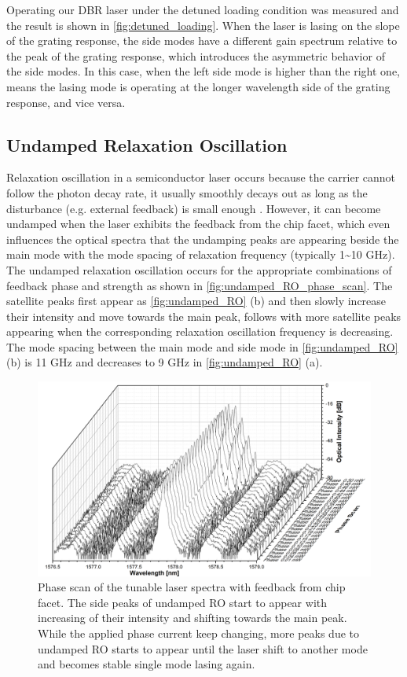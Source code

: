 Operating our DBR laser under the detuned loading condition was measured and the result is shown in \autoref{fig:detuned_loading}. When the laser is lasing on the slope of the grating response, the side modes have a different gain spectrum relative to the peak of the grating response, which introduces the asymmetric behavior of the side modes. In this case, when the left side mode is higher than the right one, means the lasing mode is operating at the longer wavelength side of the grating response, and vice versa.

\subsection{Undamped Relaxation Oscillation}\label{subsec:undamped_RO}
Relaxation oscillation in a semiconductor laser occurs because the carrier cannot follow the photon decay rate, it usually smoothly decays out as long as the disturbance (e.g. external feedback) is small enough \cite{ohtsubo2012semiconductor}. However, it can become undamped when the laser exhibits the feedback from the chip facet, which even influences the optical spectra that the undamping peaks are appearing beside the main mode with the mode spacing of relaxation frequency (typically 1\textasciitilde{}10 GHz). The undamped relaxation oscillation occurs for the appropriate combinations of feedback phase and strength as shown in \autoref{fig:undamped_RO_phase_scan}. The satellite peaks first appear as \autoref{fig:undamped_RO} (b) and then slowly increase their intensity and move towards the main peak, follows with more satellite peaks appearing when the corresponding relaxation oscillation frequency is decreasing. The mode spacing between the main mode and side mode in \autoref{fig:undamped_RO} (b) is 11 GHz and decreases to 9 GHz in \autoref{fig:undamped_RO} (a).
\begin{figure}[ht]
    \centering
    \includegraphics[width=.8\linewidth]{figures/Undamped_RO_phase_scan_grating_4621.png}
    \caption{Phase scan of the tunable laser spectra with feedback from chip facet. The side peaks of undamped RO start to appear with increasing of their intensity and shifting towards the main peak. While the applied phase current keep changing, more peaks due to undamped RO starts to appear until the laser shift to another mode and becomes stable single mode lasing again.}
    \label{fig:undamped_RO_phase_scan}
\end{figure}



